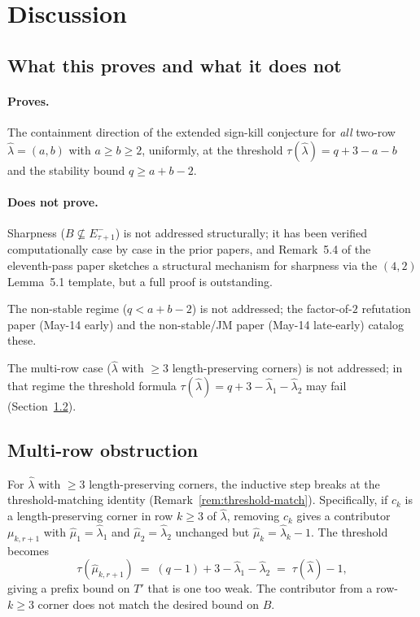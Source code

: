\documentclass[11pt]{article}
\theoremstyle{definition}
\newcommand{\hatl}{\widehat\lambda}
\newcommand{\hatm}{\widehat\mu}
\begin{document}
\section{Discussion}\label{sec:discussion}

\subsection{What this proves and what it does not}

\paragraph{Proves.}  The containment direction of the extended
sign-kill conjecture for \emph{all} two-row $\hatl = (a, b)$ with
$a \ge b \ge 2$, uniformly, at the threshold $\tau(\hatl) =
q + 3 - a - b$ and the stability bound $q \ge a + b - 2$.

\paragraph{Does not prove.}  Sharpness ($B \not\subseteq E_{\tau+1}^-$)
is not addressed structurally; it has been verified computationally
case by case in the prior papers, and Remark~5.4 of the eleventh-pass
paper sketches a structural mechanism for sharpness via the $(4, 2)$
Lemma~5.1 template, but a full proof is outstanding.

The non-stable regime ($q < a + b - 2$) is not addressed; the
factor-of-$2$ refutation paper (May-14 early) and the non-stable/JM
paper (May-14 late-early) catalog these.

The multi-row case ($\hatl$ with $\ge 3$ length-preserving corners)
is not addressed; in that regime the threshold formula
$\tau(\hatl) = q + 3 - \hatl_1 - \hatl_2$ may fail (Section~\ref{sec:multi-row}).

\subsection{Multi-row obstruction}\label{sec:multi-row}

For $\hatl$ with $\ge 3$ length-preserving corners, the inductive step
breaks at the threshold-matching identity (Remark~\ref{rem:threshold-match}).
Specifically, if $c_k$ is a length-preserving corner in row $k \ge 3$
of $\hatl$, removing $c_k$ gives a contributor $\mu_{k, r+1}$ with
$\hatm_1 = \hatl_1$ and $\hatm_2 = \hatl_2$ unchanged but $\hatm_k =
\hatl_k - 1$.  The threshold becomes
\[
   \tau(\hatm_{k, r+1}) \;=\; (q-1) + 3 - \hatl_1 - \hatl_2
   \;=\; \tau(\hatl) - 1,
\]
giving a prefix bound on $T'$ that is one too weak.  The contributor
from a row-$k \ge 3$ corner does not match the desired bound on $B$.
\end{document}
